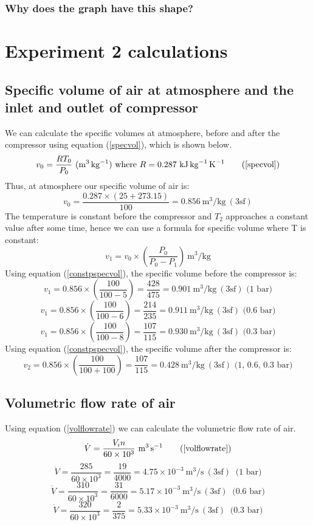 \documentclass[class=article, crop=false, 12pt,a4paper]{standalone}
\begin{document}
\subsubsection{Why does the graph have this shape?}



\section{Experiment 2 calculations}
\subsection{Specific volume of air at atmosphere and the inlet and outlet of compressor}
We can calculate the specific volumes at atmosphere, before and after the compressor using equation (\ref{specvol}), which is shown below.
\begin{equation}
  v_0 = \frac{RT_0}{P_0} \ (\si{\meter\cubed\per\kg}) \textrm{ where \(R = 0.287 \ \si{\kilo\joule\per\kg\per\kelvin}\)}
  \tag{\ref{specvol}}
\end{equation}
Thus, at atmosphere our specific volume of air is:
\[ v_0 = \frac{0.287 \times (25+273.15)}{100} = 0.856 \ \si{\meter\cubed\per\kg} \ (3\textrm{sf}) \]
The temperature is constant before the compressor and \(T_2\) approaches a constant value after some time, hence we can use a formula for specific volume where T is constant:
\begin{equation}
  v_1 = v_0 \times \left( \frac{P_0}{P_0 - P_1} \right) \ \si{\meter\cubed\per\kg}
  \label{constpspecvol}
\end{equation}
Using equation (\ref{constpspecvol}), the specific volume before the compressor is:
\[ v_1 = 0.856 \times \left( \frac{100}{100-5} \right) = \frac{428}{475} = 0.901 \ \si{\meter\cubed\per\kg} \ (3\textrm{sf}) \textrm{ (1 bar)} \]
\[ v_1 = 0.856 \times \left( \frac{100}{100-6} \right) = \frac{214}{235} = 0.911 \ \si{\meter\cubed\per\kg} \ (3\textrm{sf}) \textrm{ (0.6 bar)} \]
\[ v_1 = 0.856 \times \left( \frac{100}{100-8} \right) = \frac{107}{115} = 0.930 \ \si{\meter\cubed\per\kg} \ (3\textrm{sf}) \textrm{ (0.3 bar)} \]
Using equation (\ref{constpspecvol}), the specific volume after the compressor is:
\[ v_2 = 0.856 \times \left( \frac{100}{100+100} \right) = \frac{107}{115} = 0.428 \ \si{\meter\cubed\per\kg} \ (3\textrm{sf}) \textrm{ (1, 0.6, 0.3 bar)} \]
\subsection{Volumetric flow rate of air}
Using equation (\ref{volflowrate}) we can calculate the volumetric flow rate of air.
\begin{equation}
  \dot{V} = \frac{V_in}{60 \times 10^3} \ \si{\meter\cubed\per\second}
  \tag{\ref{volflowrate}}
\end{equation}
\[ \dot{V} = \frac{285}{60\times 10^3} = \frac{19}{4000} = 4.75 \times 10^{-3} \ \si{\meter\cubed\per\second} \ (3\textrm{sf}) \ \textrm{ (1 bar)}\]
\[ \dot{V} = \frac{310}{60\times 10^3} = \frac{31}{6000} = 5.17 \times 10^{-3} \ \si{\meter\cubed\per\second} \ (3\textrm{sf}) \ \textrm{ (0.6 bar)}\]
\[ \dot{V} = \frac{320}{60\times 10^3} = \frac{2}{375} = 5.33 \times 10^{-3} \ \si{\meter\cubed\per\second} \ (3\textrm{sf}) \ \textrm{ (0.3 bar)}\]
\end{document}
